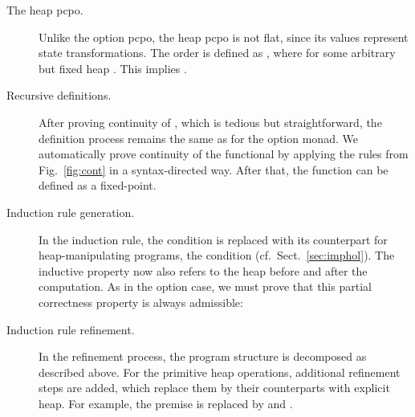 \documentclass[copyright,creativecommons,sharealike]{eptcs}
\theoremstyle{remark}
\begin{document}
\begin{isabellebody}
\begin{isamarkuptext}
  \begin{description}
  \item[The heap pcpo.] Unlike the option pcpo, the heap
  pcpo is not flat, since its values represent state transformations.
  The order is defined as , where \mbox{} for some
  arbitrary but fixed heap . This implies .

  \item[Recursive definitions.]
  After proving continuity of \isa{{\isasymguillemotright}{\isacharequal}}, which is tedious but
  straightforward, the definition process remains the same as for the
  option monad. We automatically prove continuity of the functional by
  applying the rules from Fig.~\ref{fig:cont} in a syntax-directed
  way. After that, the function can be defined as a fixed-point.

  \item[Induction rule generation.]
  In the induction rule, the condition  is
  replaced with its counterpart for heap-manipulating programs,
  the condition  (cf.~Sect.~\ref{sec:imphol}).
  The inductive property  now also refers to the heap before and after the computation.
  As in the option case, we must prove that this partial correctness
  property is always admissible:
  \begin{quote}
  \end{quote}
  \item[Induction rule refinement.] In the refinement process, the program structure is
  decomposed as described above. For the primitive heap operations,
  additional refinement steps are added, which replace them by their
  counterparts with explicit heap. For example, the premise  is replaced by  and .
  \end{description}


\end{isamarkuptext}
\end{isabellebody}
\end{document}
